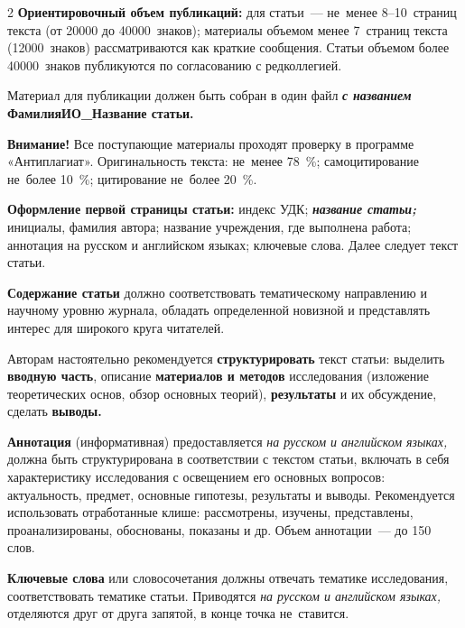 \begin{multicols}{2}
\textbf{Ориентировочный объем публикаций:} для статьи~— не~менее
8--10~страниц текста (от \num{20000} до \num{40000}~знаков); материалы объемом
менее 7~страниц текста (\num{12000}~знаков) рассматриваются как краткие
сообщения. Статьи объемом более \num{40000}~знаков публикуются по
согласованию с редколлегией.

\vspace{0.5em}

Материал для публикации должен быть собран в один файл \emph{\textbf{с
названием}} \textbf{ФамилияИО\_Название статьи.}

\vspace{0.5em}
\textbf{Внимание!} Все поступающие материалы проходят проверку в
программе «Антиплагиат». Оригинальность текста: не~менее 78~\%;
самоцитирование не~более 10~\%; цитирование не~более 20~\%.

\vspace{0.5em}
\textbf{Оформление первой страницы статьи:} индекс УДК;
\emph{\textbf{название статьи;}} инициалы, фамилия автора; название
учреждения, где выполнена работа; аннотация на русском и английском
языках; ключевые слова. Далее следует текст статьи.

\vspace{0.5em}
\textbf{Содержание статьи} должно соответствовать тематическому
направлению и научному уровню журнала, обладать определенной новизной и
представлять интерес для широкого круга читателей.

\vspace{0.45em}

Авторам настоятельно рекомендуется \textbf{структурировать} текст
статьи: выделить \textbf{вводную часть}, описание \textbf{материалов и
методов} исследования (изложение теоретических основ, обзор основных
теорий), \textbf{результаты} и их обсуждение, сделать \textbf{выводы.}

\vspace{0.4em}
\textbf{Аннотация} (информативная) предоставляется \emph{на русском и
английском языках,} должна быть структурирована в соответствии с текстом
статьи, включать в себя характеристику исследования с освещением его
основных вопросов: актуальность, предмет, основные гипотезы, результаты
и выводы. Рекомендуется использовать отработанные клише: рассмотрены,
изучены, представлены, проанализированы, обоснованы, показаны и др.
Объем аннотации~— до 150 слов.

\newpage

\textbf{Ключевые слова} или словосочетания должны отвечать тематике
исследования, соответствовать тематике статьи. Приводятся \emph{на
русском и английском языках,} отделяются друг от друга запятой, в конце
точка не~ставится.


\end{multicols}
